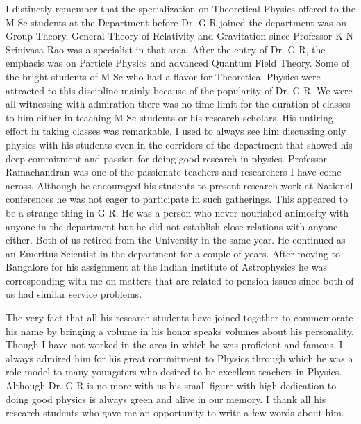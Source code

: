 I distinctly remember that the specialization on Theoretical Physics offered to the M Sc students at the Department before Dr. G R joined the department was on Group Theory, General Theory of Relativity and Gravitation since Professor K N Srinivasa Rao was a specialist in that area. After the entry of Dr. G R, the emphasis was on Particle Physics and advanced Quantum Field Theory. Some of the bright students of M Sc who had a flavor for Theoretical Physics were attracted to this discipline mainly because of the popularity of Dr. G R. We were all witnessing with admiration there was no time limit for the duration of classes to him either in teaching M Sc students or his research scholars. His untiring effort in taking classes was remarkable. I used to always see him discussing only physics with his students even in the corridors of the department that showed his deep commitment and passion for doing good research in physics.  Professor Ramachandran was one of the passionate teachers and researchers I have come across. Although he encouraged his students to present research work at National conferences he was not eager to participate in such gatherings. This appeared to be a strange thing in G R.  He was a person who never nourished animosity with anyone in the department but he did not establish close relations with anyone either. Both of us retired from the University in the same year. He continued as an Emeritus Scientist in the department for a couple of years. After moving to Bangalore for his assignment at the Indian Institute of Astrophysics he was corresponding with me on matters that are related to pension issues since both of us had similar service problems.

The very fact that all his research students have joined together to commemorate his name by bringing a volume in his honor speaks volumes about his personality. Though I have not worked in the area in which he was proficient and famous, I always admired him for his great commitment to Physics through which he was a role model to many youngsters who desired to be excellent teachers in Physics. Although Dr. G R is no more with us his small figure with high dedication to doing good physics is always green and alive in our memory. I thank all his research students who gave me an opportunity to write a few words about him.


